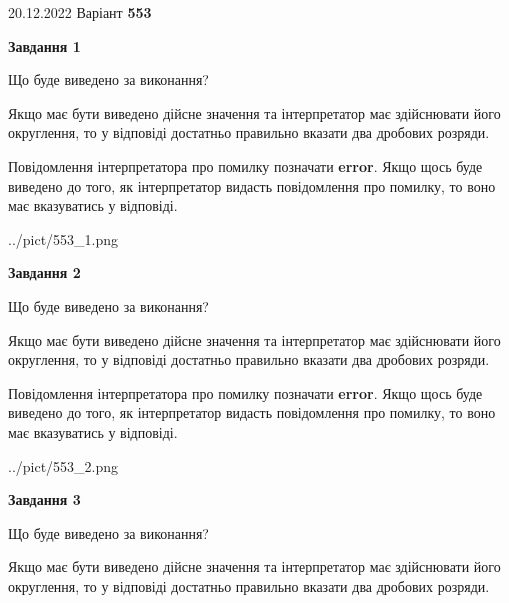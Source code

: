 \documentclass[12pt, ukrainian]{article}
\begin{document}
{20.12.2022 Варіант \No \textbf { 553 }\par}
{
\begin {Large}

{\begin {center}\textbf{Завдання 1}\end {center}}\par
Що буде виведено за виконання? \par

Якщо має бути виведено дійсне значення та інтерпретатор має здійснювати його округлення, 
то у відповіді достатньо правильно вказати два дробових розряди.

Повідомлення інтерпретатора про помилку позначати \textbf{error}.
Якщо щось буде виведено до того, як інтерпретатор видасть повідомлення про помилку, 
то воно має вказуватись у відповіді. \par

\begin{center}
	{../pict/553_1.png}
\end{center}
\newpage

{\begin {center}\textbf{Завдання 2}\end {center}}\par
Що буде виведено за виконання? \par

Якщо має бути виведено дійсне значення та інтерпретатор має здійснювати його округлення, 
то у відповіді достатньо правильно вказати два дробових розряди.

Повідомлення інтерпретатора про помилку позначати \textbf{error}.
Якщо щось буде виведено до того, як інтерпретатор видасть повідомлення про помилку, 
то воно має вказуватись у відповіді. \par

\begin{center}
	{../pict/553_2.png}
\end{center}
\newpage

{\begin {center}\textbf{Завдання 3}\end {center}}\par
Що буде виведено за виконання? \par

Якщо має бути виведено дійсне значення та інтерпретатор має здійснювати його округлення, 
то у відповіді достатньо правильно вказати два дробових розряди.


\end{Large}}
\end{document}
